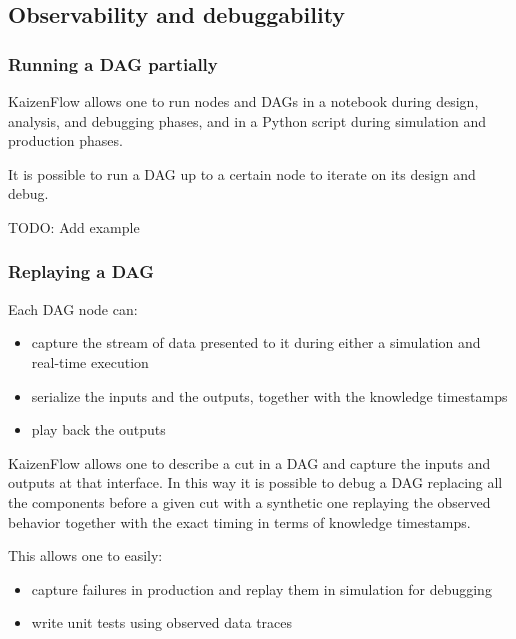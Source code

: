 \documentclass[11pt, reqno]{amsart}
\theoremstyle{definition}
\theoremstyle{remark}
\begin{document}
  \subsection{Observability and debuggability}

  \subsubsection{Running a DAG partially}
  KaizenFlow allows one to run nodes and DAGs in a notebook during design, analysis,
  and debugging phases, and in a Python script during simulation and production phases.

  It is possible to run a DAG up to a certain node to iterate on its design and debug.

  TODO: Add example

  \subsubsection{Replaying a DAG}

  Each DAG node can:

  \begin{itemize}
    \item capture the stream of data presented to it during either a simulation and
      real-time execution

    \item serialize the inputs and the outputs, together with the knowledge
      timestamps

    \item play back the outputs
  \end{itemize}

  KaizenFlow allows one to describe a cut in a DAG and capture the inputs and outputs
  at that interface. In this way it is possible to debug a DAG replacing all the
  components before a given cut with a synthetic one replaying the observed
  behavior together with the exact timing in terms of knowledge timestamps.

  This allows one to easily:

  \begin{itemize}
    \item capture failures in production and replay them in simulation for debugging

    \item write unit tests using observed data traces
  \end{itemize}
\end{document}
